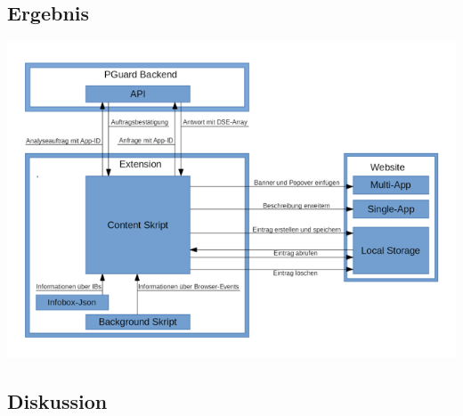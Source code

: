 




\subsection{Ergebnis}
\label{ss:ergebnisseht1}

\includegraphics{pics/Aufbau.png}

\subsection{Diskussion}
\label{ss:diskussionht1}










